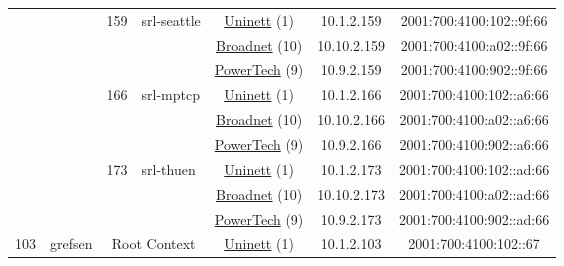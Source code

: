 \begin{small}
\begin{center}
\begin{longtable}{|c|c|c|c|c|c|c|c|}
  &  & \multirow{3}{*}{\tiny{159}} & \multicolumn{1}{|l|}{\multirow{3}{*}{\tiny{srl-seattle}}} & \multicolumn{2}{|c|}{\tiny{\href{https://www.uninett.no}{Uninett} (1)}} & \tiny{10.1.2.159} & \tiny{2001:700:4100:102::9f:66} \\* \cline{5-5}\cline{6-6}\cline{7-7}\cline{8-8}
  &  &  &  & \multicolumn{2}{|c|}{\tiny{\href{https://www.broadnet.no}{Broadnet} (10)}} & \tiny{10.10.2.159} & \tiny{2001:700:4100:a02::9f:66} \\* \cline{5-5}\cline{6-6}\cline{7-7}\cline{8-8}
  &  &  &  & \multicolumn{2}{|c|}{\tiny{\href{http://www.powertech.no}{PowerTech} (9)}} & \tiny{10.9.2.159} & \tiny{2001:700:4100:902::9f:66} \\* \cline{3-3}\cline{4-4}\cline{5-5}\cline{6-6}\cline{7-7}\cline{8-8}
  &  & \multirow{3}{*}{\tiny{166}} & \multicolumn{1}{|l|}{\multirow{3}{*}{\tiny{srl-mptcp}}} & \multicolumn{2}{|c|}{\tiny{\href{https://www.uninett.no}{Uninett} (1)}} & \tiny{10.1.2.166} & \tiny{2001:700:4100:102::a6:66} \\* \cline{5-5}\cline{6-6}\cline{7-7}\cline{8-8}
  &  &  &  & \multicolumn{2}{|c|}{\tiny{\href{https://www.broadnet.no}{Broadnet} (10)}} & \tiny{10.10.2.166} & \tiny{2001:700:4100:a02::a6:66} \\* \cline{5-5}\cline{6-6}\cline{7-7}\cline{8-8}
  &  &  &  & \multicolumn{2}{|c|}{\tiny{\href{http://www.powertech.no}{PowerTech} (9)}} & \tiny{10.9.2.166} & \tiny{2001:700:4100:902::a6:66} \\* \cline{3-3}\cline{4-4}\cline{5-5}\cline{6-6}\cline{7-7}\cline{8-8}
  &  & \multirow{3}{*}{\tiny{173}} & \multicolumn{1}{|l|}{\multirow{3}{*}{\tiny{srl-thuen}}} & \multicolumn{2}{|c|}{\tiny{\href{https://www.uninett.no}{Uninett} (1)}} & \tiny{10.1.2.173} & \tiny{2001:700:4100:102::ad:66} \\* \cline{5-5}\cline{6-6}\cline{7-7}\cline{8-8}
  &  &  &  & \multicolumn{2}{|c|}{\tiny{\href{https://www.broadnet.no}{Broadnet} (10)}} & \tiny{10.10.2.173} & \tiny{2001:700:4100:a02::ad:66} \\* \cline{5-5}\cline{6-6}\cline{7-7}\cline{8-8}
  &  &  &  & \multicolumn{2}{|c|}{\tiny{\href{http://www.powertech.no}{PowerTech} (9)}} & \tiny{10.9.2.173} & \tiny{2001:700:4100:902::ad:66} \\ \hline
 \multirow{30}{*}{\tiny{103}} & \multicolumn{1}{|l|}{\multirow{30}{*}{\tiny{grefsen}}} & \multicolumn{2}{|c|}{\multirow{3}{*}{\tiny{Root Context}}} & \multicolumn{2}{|c|}{\tiny{\href{https://www.uninett.no}{Uninett} (1)}} & \tiny{10.1.2.103} & \tiny{2001:700:4100:102::67} \\* \cline{5-5}\cline{6-6}\cline{7-7}\cline{8-8}

\end{longtable}
\end{center}
\end{small}
